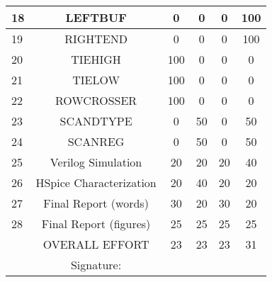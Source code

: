 \begin{table}[htb!]
\begin{tabular}{|p{1cm}|c|c|c|c|c|}
18&LEFTBUF					&	0	&	0	&	0	&	100	\\ \hline
19&RIGHTEND					&	0	&	0	&	0	&	100	\\ \hline
20&TIEHIGH					&	100	&	0	&	0	&	0	\\ \hline
21&TIELOW						&	100	&	0	&	0	&	0	\\ \hline
22&ROWCROSSER				&	100	&	0	&	0	&	0	\\ \hline
23&SCANDTYPE				&	0	&	50	&	0	&	50	\\ \hline
24&SCANREG					&	0	&	50	&	0	&	50	\\ \hline
25&Verilog Simulation				&	20	&	20	&	20	&	40	\\ \hline
26&HSpice Characterization	&	20	&	40	&	20	&	20	\\ \hline
27& Final Report (words)		&	30	&	20	&	30	&	20	\\ \hline
28& Final Report (figures)	&	25	&	25	&	25	&	25	\\ \hline
& OVERALL EFFORT 						&	23	&	23	&	23	&	31	\\ \hline
& Signature: 								& 		& 		& 		&		\\ \hline
\end{tabular}
\end{table}
